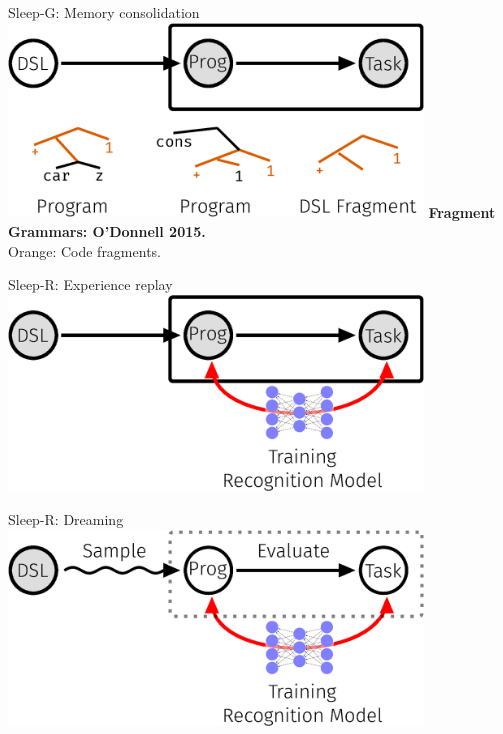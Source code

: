 \documentclass{beamer}
\begin{document}
\begin{frame}[t]{Sleep-G: Memory consolidation}
  \includegraphics[width = 11cm]{figures/animation/Sleep-G.eps}
  \vfill
  \textbf{Fragment Grammars: O'Donnell 2015.}\\
  Orange: Code fragments.\\

  
\end{frame}
\begin{frame}[t]{Sleep-R: Experience replay}
  \includegraphics[width = 11cm]{figures/animation/Sleep-R-1.eps}
\end{frame}
\begin{frame}[t]{Sleep-R: Dreaming}
  \includegraphics[width = 11cm]{figures/animation/Sleep-R-2.eps}

\end{frame}
\end{document}
